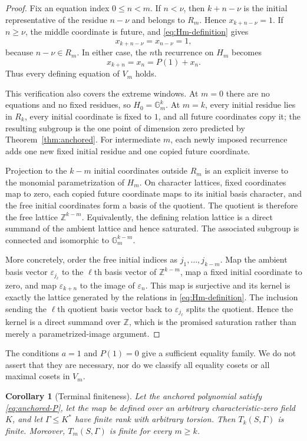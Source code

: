 \documentclass[11pt]{article}
\newtheorem{corollary}[theorem]{Corollary}
\theoremstyle{definition}
\theoremstyle{remark}
\newcommand{\Gm}{\mathbb{G}_{m}}
\newcommand{\Z}{\mathbb{Z}}
\newcommand{\Gam}{\Gamma}
\begin{document}
\begin{proof}
Fix an equation index $0\leq n<m$.  If $n<\nu$, then $k+n-\nu$ is the initial representative of the residue $n-\nu$ and belongs to $R_m$.  Hence $x_{k+n-\nu}=1$.  If $n\geq\nu$, the middle coordinate is future, and \eqref{eq:Hm-definition} gives
\[
x_{k+n-\nu}=x_{n-\nu}=1,
\]
because $n-\nu\in R_m$.  In either case, the $n$th recurrence on $H_m$ becomes
\[
x_{k+n}=x_n=P(1)+x_n.
\]
Thus every defining equation of $V_m$ holds.

This verification also covers the extreme windows.  At $m=0$ there are no
equations and no fixed residues, so $H_0=\Gm^k$.  At $m=k$, every initial
residue lies in $R_k$, every initial coordinate is fixed to $1$, and all
future coordinates copy it; the resulting subgroup is the one point of
dimension zero predicted by Theorem~\ref{thm:anchored}.  For intermediate
$m$, each newly imposed recurrence adds one new fixed initial residue and
one copied future coordinate.

Projection to the $k-m$ initial coordinates outside $R_m$ is an explicit inverse to the monomial parametrization of $H_m$.  On character lattices, fixed coordinates map to zero, each copied future coordinate maps to its initial basis character, and the free initial coordinates form a basis of the quotient.  The quotient is therefore the free lattice $\Z^{k-m}$.  Equivalently, the defining relation lattice is a direct summand of the ambient lattice and hence saturated.  The associated subgroup is connected and isomorphic to $\Gm^{k-m}$.

More concretely, order the free initial indices as
$j_1,\ldots,j_{k-m}$.  Map the ambient basis vector
$\varepsilon_{j_\ell}$ to the $\ell$th basis vector of $\Z^{k-m}$, map a
fixed initial coordinate to zero, and map
$\varepsilon_{k+n}$ to the image of $\varepsilon_n$.  This map is
surjective and its kernel is exactly the lattice generated by the relations
in \eqref{eq:Hm-definition}.  The inclusion sending the $\ell$th quotient
basis vector back to $\varepsilon_{j_\ell}$ splits the quotient.  Hence the
kernel is a direct summand over $\Z$, which is the promised saturation rather
than merely a parametrized-image argument.
\end{proof}

The conditions $a=1$ and $P(1)=0$ give a sufficient equality family.  We do not assert that they are necessary, nor do we classify all equality cosets or all maximal cosets in $V_m$.

\begin{corollary}[Terminal finiteness]
\label{cor:terminal-finite}
Let the anchored polynomial satisfy \eqref{eq:anchored-P}, let the map be defined over an arbitrary characteristic-zero field $K$, and let $\Gam\leq K^*$ have finite rank with arbitrary torsion.  Then $T_k(S,\Gam)$ is finite.  Moreover, $T_m(S,\Gam)$ is finite for every $m\geq k$.
\end{corollary}
\end{document}
